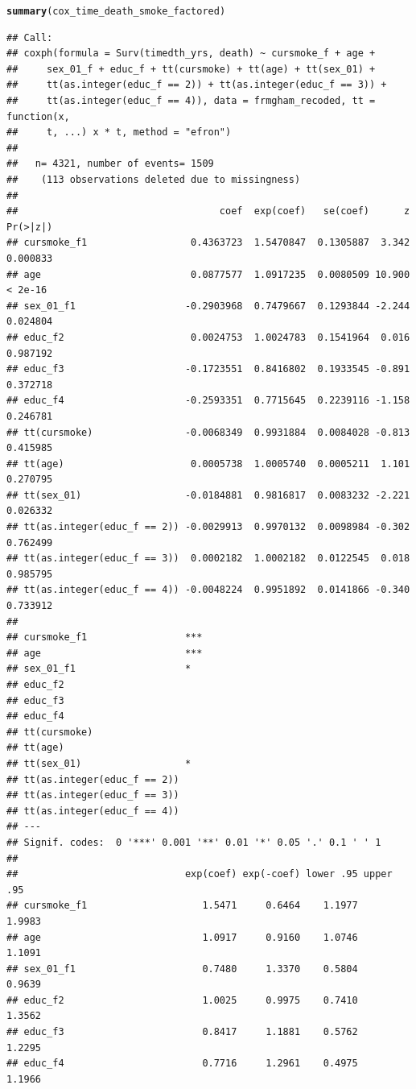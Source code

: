 \documentclass{article}\usepackage[]{graphicx}\usepackage[]{color}
\makeatletter
\newcommand{\hlstd}[1]{\textcolor[rgb]{0.345,0.345,0.345}{#1}}%
\newcommand{\hlkwd}[1]{\textcolor[rgb]{0.737,0.353,0.396}{\textbf{#1}}}%
\newenvironment{kframe}{%
 \def\at@end@of@kframe{}%
 \ifinner\ifhmode%
  \def\at@end@of@kframe{\end{minipage}}%
  \begin{minipage}{\columnwidth}%
 \fi\fi%
 \def\FrameCommand##1{\hskip\@totalleftmargin \hskip-\fboxsep
 \colorbox{shadecolor}{##1}\hskip-\fboxsep
     \hskip-\linewidth \hskip-\@totalleftmargin \hskip\columnwidth}%
 \MakeFramed {\advance\hsize-\width
   \@totalleftmargin\z@ \linewidth\hsize
   \@setminipage}}%
 {\par\unskip\endMakeFramed%
 \at@end@of@kframe}
\newenvironment{knitrout}{}{} %
\makeatother
\begin{document}
\begin{knitrout}
\begin{kframe}
\begin{alltt}
\hlkwd{summary}\hlstd{(cox_time_death_smoke_factored)}
\end{alltt}
\begin{verbatim}
## Call:
## coxph(formula = Surv(timedth_yrs, death) ~ cursmoke_f + age + 
##     sex_01_f + educ_f + tt(cursmoke) + tt(age) + tt(sex_01) + 
##     tt(as.integer(educ_f == 2)) + tt(as.integer(educ_f == 3)) + 
##     tt(as.integer(educ_f == 4)), data = frmgham_recoded, tt = function(x, 
##     t, ...) x * t, method = "efron")
## 
##   n= 4321, number of events= 1509 
##    (113 observations deleted due to missingness)
## 
##                                   coef  exp(coef)   se(coef)      z Pr(>|z|)
## cursmoke_f1                  0.4363723  1.5470847  0.1305887  3.342 0.000833
## age                          0.0877577  1.0917235  0.0080509 10.900  < 2e-16
## sex_01_f1                   -0.2903968  0.7479667  0.1293844 -2.244 0.024804
## educ_f2                      0.0024753  1.0024783  0.1541964  0.016 0.987192
## educ_f3                     -0.1723551  0.8416802  0.1933545 -0.891 0.372718
## educ_f4                     -0.2593351  0.7715645  0.2239116 -1.158 0.246781
## tt(cursmoke)                -0.0068349  0.9931884  0.0084028 -0.813 0.415985
## tt(age)                      0.0005738  1.0005740  0.0005211  1.101 0.270795
## tt(sex_01)                  -0.0184881  0.9816817  0.0083232 -2.221 0.026332
## tt(as.integer(educ_f == 2)) -0.0029913  0.9970132  0.0098984 -0.302 0.762499
## tt(as.integer(educ_f == 3))  0.0002182  1.0002182  0.0122545  0.018 0.985795
## tt(as.integer(educ_f == 4)) -0.0048224  0.9951892  0.0141866 -0.340 0.733912
##                                
## cursmoke_f1                 ***
## age                         ***
## sex_01_f1                   *  
## educ_f2                        
## educ_f3                        
## educ_f4                        
## tt(cursmoke)                   
## tt(age)                        
## tt(sex_01)                  *  
## tt(as.integer(educ_f == 2))    
## tt(as.integer(educ_f == 3))    
## tt(as.integer(educ_f == 4))    
## ---
## Signif. codes:  0 '***' 0.001 '**' 0.01 '*' 0.05 '.' 0.1 ' ' 1
## 
##                             exp(coef) exp(-coef) lower .95 upper .95
## cursmoke_f1                    1.5471     0.6464    1.1977    1.9983
## age                            1.0917     0.9160    1.0746    1.1091
## sex_01_f1                      0.7480     1.3370    0.5804    0.9639
## educ_f2                        1.0025     0.9975    0.7410    1.3562
## educ_f3                        0.8417     1.1881    0.5762    1.2295
## educ_f4                        0.7716     1.2961    0.4975    1.1966

\end{verbatim}
\end{kframe}
\end{knitrout}
\end{document}
